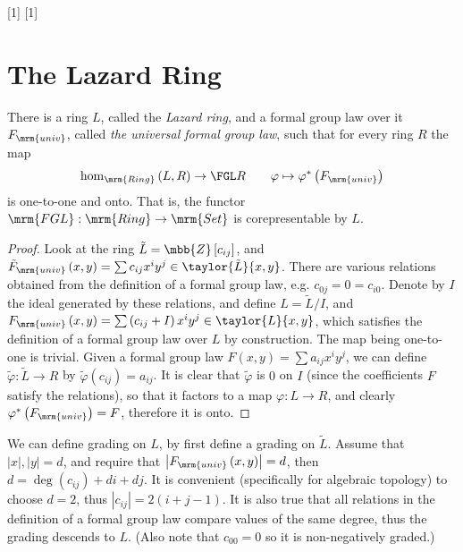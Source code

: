 \ncmd{\LR}[1]{}
\ncmd{\LRQ}[1]{}

\section{The Lazard Ring}

\begin{theorem*}
	There is a ring $L$, called the \emph{Lazard ring}, and a formal group law over it $F_\mrm{univ}$, called \emph{the universal formal group law},
	such that for every ring $R$ the map
	$$
		\hom_\mrm{Ring}\left(L,R\right)
		\to
		\FGL R
		\qquad
		\varphi \mapsto \varphi^*\left(F_\mrm{univ}\right)
	$$
	is one-to-one and onto.
	That is, the functor $\mrm{FGL}: \mrm{Ring} \to \mrm{Set}$ is corepresentable by $L$.
\end{theorem*}

\begin{proof}
	Look at the ring $\tilde{L} = \mbb{Z}\left[c_{ij}\right]$,
	and
	$
		\tilde{F}_\mrm{univ}\left(x,y\right)
		=
		\sum c_{ij} x^i y^j
		\in
		\taylor{\tilde{L}}{x,y}
	$.
	There are various relations obtained from the definition of a formal group law, e.g. $c_{0j} = 0 = c_{i0}$.
	Denote by $I$ the ideal generated by these relations, and define $L=\tilde{L}/I$,
	and
	$
		F_\mrm{univ}\left(x,y\right)
		=
		\sum \left(c_{ij} + I\right) x^i y^j
		\in
		\taylor{L}{x,y}
	$,
	which satisfies the definition of a formal group law over $L$ by construction.
	The map being one-to-one is trivial.
	Given a formal group law $F\left(x,y\right) = \sum a_{ij} x^i y^j$,
	we can define $\tilde{\varphi}: \tilde{L} \to R$ by $\tilde{\varphi}\left(c_{ij}\right) = a_{ij}$.
	It is clear that $\tilde{\varphi}$ is $0$ on $I$ (since the coefficients $F$ satisfy the relations), so that it factors to a map $\varphi: L \to R$, and clearly $\varphi^*\left(F_\mrm{univ}\right) = F$,
	therefore it is onto.
\end{proof}

We can define grading on $L$, by first define a grading on $\tilde{L}$.
Assume that $\left|x\right|,\left|y\right| = d$, and require that $\left|F_\mrm{univ}\left(x,y\right)\right| = d$, then $d = \deg\left(c_{ij}\right) + di +dj$.
It is convenient (specifically for algebraic topology) to choose $d=2$, thus $\left|c_{ij}\right| = 2\left(i+j-1\right)$.
It is also true that all relations in the definition of a formal group law compare values of the same degree, thus the grading descends to $L$.
(Also note that $c_{00}=0$ so it is non-negatively graded.)

